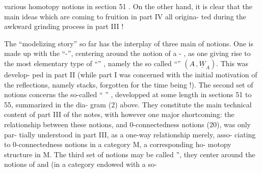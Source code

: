 
various homotopy notions in section 51 .  On the other hand,  it is clear
that the main ideas which are coming to fruition in part IV  all origina-%
ted  during the awkward grinding process in part III  !

The  ``modelizing story''  so far has  the interplay
of three main  of notions.  One  is made up with the 
``\hand{\uline{\textcolor{black}{test}}}-\hand{\uline{\textcolor{black}{notions}}}'',  centering around the notion of a \hand{\uline{\textcolor{black}{test}}}-\hand{\uline{\textcolor{black}{category}}} ,  as
one giving rise to the most elementary type of ``\hand{\uline{\textcolor{black}{modelizers}}}'' ,  namely the
so called ``\hand{\uline{\textcolor{black}{elementary modelizers}}}'' $(A\hat{}\,,\underline{W}_A)$.   This was develop-%
ped in part II  (while part I was concerned with the initial motivation
of the reflections,  namely stacks,  forgotten for the time being !).
The second set of notions concerns the so-called ``\hand{\uline{\textcolor{black}{homotopy}}} \hand{\uline{\textcolor{black}{notions}}}'' ,
developped at some length  in sections 51 to 55,  summarized in the dia-%
gram (2) above.  They constitute the main technical content of part III
of the notes,  with however one major shortcoming:  the relationship
between these notions,  and 0-connectedness notions  (20),  was only par-%
tially understood in part III,  as a one-way relationship merely,  asso-%
ciating to  0-connectedness notions in a category M,  a corresponding ho-%
motopy structure in M.  The third set of notions  may
be called \hand{\uline{\textcolor{black}{asphericity}}} \hand{\uline{\textcolor{black}{notions}}}'',  they center around the notions of
\hand{\uline{\textcolor{black}{aspheric}}} \hand{\uline{\textcolor{black}{objects}}} and \hand{\uline{\textcolor{black}{aspheric}}} \hand{\uline{\textcolor{black}{maps}}} (in a category endowed with a so-%

